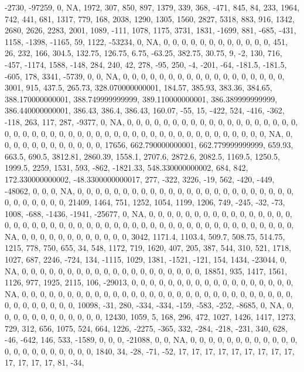 \documentclass[
]{article}
\begin{document}
-2730, -97259, 0, NA, 1972, 307, 850, 897, 1379, 339, 368, -471, 845,
84, 233, 1964, 742, 441, 681, 1317, 779, 168, 2038, 1290, 1305, 1560,
2827, 5318, 883, 916, 1342, 2680, 2626, 2283, 2001, 1089, -111, 1078,
1175, 3731, 1831, -1699, 881, -685, -431, 1158, -1398, -1165, 59, 1122,
-53234, 0, NA, 0, 0, 0, 0, 0, 0, 0, 0, 0, 0, 0, 0, 451, 26, 232, 166,
304.5, 132.75, 126.75, 6.75, -63.25, 382.75, 30.75, 9, -2, 130, 716,
-457, -1174, 1588, -148, 284, 240, 42, 278, -95, 250, -4, -201, -64,
-181.5, -181.5, -605, 178, 3341, -5739, 0, 0, NA, 0, 0, 0, 0, 0, 0, 0,
0, 0, 0, 0, 0, 0, 0, 0, 0, 0, 0, 3001, 915, 437.5, 265.73,
328.070000000001, 184.57, 385.93, 383.36, 384.65, 388.170000000001,
388.749999999999, 389.110000000001, 386.389999999999, 386.440000000001,
386.43, 386.4, 386.43, 160.07, -55, 15, -422, 524, -416, -362, -118,
263, 117, 287, -9377, 0, NA, 0, 0, 0, 0, 0, 0, 0, 0, 0, 0, 0, 0, 0, 0,
0, 0, 0, 0, 0, 0, 0, 0, 0, 0, 0, 0, 0, 0, 0, 0, 0, 0, 0, 0, 0, 0, 0, 0,
0, 0, 0, 0, 0, 0, 0, 0, 0, 0, NA, 0, 0, 0, 0, 0, 0, 0, 0, 0, 0, 0, 0,
17656, 662.790000000001, 662.779999999999, 659.93, 663.5, 690.5,
3812.81, 2860.39, 1558.1, 2707.6, 2872.6, 2082.5, 1169.5, 1250.5,
1999.5, 2259, 1531, 593, -862, -1821.33, 548.330000000002, 684, 842,
172.330000000002, -48.3300000000017, 277, -322, 3226, -19, 562, -420,
-449, -48062, 0, 0, 0, NA, 0, 0, 0, 0, 0, 0, 0, 0, 0, 0, 0, 0, 0, 0, 0,
0, 0, 0, 0, 0, 0, 0, 0, 0, 0, 0, 0, 0, 0, 0, 0, 21409, 1464, 751, 1252,
1054, 1199, 1206, 749, -245, -32, -73, 1008, -688, -1436, -1941, -25677,
0, NA, 0, 0, 0, 0, 0, 0, 0, 0, 0, 0, 0, 0, 0, 0, 0, 0, 0, 0, 0, 0, 0, 0,
0, 0, 0, 0, 0, 0, 0, 0, 0, 0, 0, 0, 0, 0, 0, 0, 0, 0, 0, 0, 0, 0, 0, 0,
0, 0, NA, 0, 0, 0, 0, 0, 0, 0, 0, 0, 0, 0, 0, 3042, 1171.4, 1103.4,
509.7, 508.75, 514.75, 1215, 778, 750, 655, 34, 548, 1172, 719, 1620,
407, 205, 387, 544, 310, 521, 1718, 1027, 687, 2246, -724, 134, -1115,
1029, 1381, -1521, -121, 154, 1434, -23044, 0, NA, 0, 0, 0, 0, 0, 0, 0,
0, 0, 0, 0, 0, 0, 0, 0, 0, 0, 0, 0, 0, 18851, 935, 1417, 1561, 1126,
977, 1925, 2115, 106, -29013, 0, 0, 0, 0, 0, 0, 0, 0, 0, 0, 0, 0, 0, 0,
0, 0, 0, 0, NA, 0, 0, 0, 0, 0, 0, 0, 0, 0, 0, 0, 0, 0, 0, 0, 0, 0, 0, 0,
0, 0, 0, 0, 0, 0, 0, 0, 0, 0, 0, 0, 0, 0, 0, 0, 0, 0, 0, 10098, -31,
280, -334, -334, -159, -583, -252, -8685, 0, NA, 0, 0, 0, 0, 0, 0, 0, 0,
0, 0, 0, 0, 12430, 1059, 5, 168, 296, 472, 1027, 1426, 1417, 1273, 729,
312, 656, 1075, 524, 664, 1226, -2275, -365, 332, -284, -218, -231, 340,
628, -46, -642, 146, 533, -1589, 0, 0, 0, -21088, 0, 0, NA, 0, 0, 0, 0,
0, 0, 0, 0, 0, 0, 0, 0, 0, 0, 0, 0, 0, 0, 0, 0, 0, 0, 1840, 34, -28,
-71, -52, 17, 17, 17, 17, 17, 17, 17, 17, 17, 17, 17, 17, 17, 81, -34,
\end{document}
